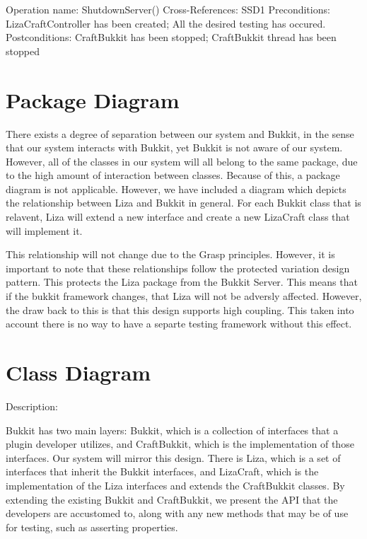 \documentclass{article}
\begin{document}
Operation name: ShutdownServer() 
\newline \indent
Cross-References: SSD1 
\newline  \indent
Preconditions: LizaCraftController has been created; All the desired testing \indent has occured.
\newline  \indent
Postconditions: CraftBukkit has been stopped; CraftBukkit thread has been \indent stopped
 \newline \newline

\section{Package Diagram}

There exists a degree of separation between our system and Bukkit, in the
sense that our system interacts with Bukkit, yet Bukkit is not aware of our
system. However, all of the classes in our system will all belong to the same
package, due to the high amount of interaction between classes. Because
of this, a package diagram is not applicable.  However, we have included a 
diagram which depicts the relationship between Liza and Bukkit in general.
For each Bukkit class that is relavent, Liza will extend a new interface and 
create a new LizaCraft class that will implement it. \newline 

\noindent This relationship will not change due to the Grasp principles.  However, it is important to 
note that these relationships follow the protected variation design pattern.  This protects the Liza
package from the Bukkit Server.  This means that if the bukkit framework changes, that Liza will not be adversly
affected.  However, the draw back to this is that this design supports high coupling.  This taken into account there
is no way to have a separte testing framework without this effect.



\section{Class Diagram}

Description:
\newline

\noindent
Bukkit has two main layers: Bukkit, which is a collection of interfaces that
a plugin developer utilizes, and CraftBukkit, which is the implementation
of those interfaces. Our system will mirror this design. There is Liza, which
is a set of interfaces that inherit the Bukkit interfaces, and LizaCraft, which
is the implementation of the Liza interfaces and extends the CraftBukkit classes.
By extending the existing Bukkit and CraftBukkit, we present the API that
the developers are accustomed to, along with any new methods that may
be of use for testing, such as asserting properties. 
\newline
\end{document}
